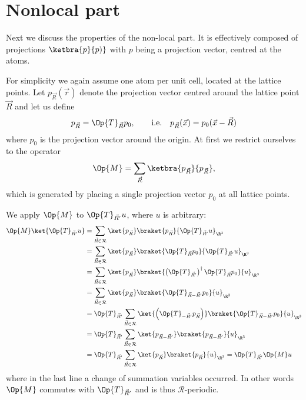 \documentclass{MFHarticle}
\begin{document}
\section{Nonlocal part}
Next we discuss the properties of the non-local part.
It is effectively composed of projections $\ketbra{p}{p)}$
with $p$ being a projection vector, centred at the atoms.

For simplicity we again assume one atom per unit cell,
located at the lattice points.
Let $p_{\vec{R}}(\vec{r})$ denote the projection vector centred
around the lattice point $\vec{R}$ and let us define
\[ p_{\vec{R}} = \Op{T}_{\vec{R}} p_0,
\qquad \text{i.e.} \quad
p_{\vec{R}}(\vec{x}) = p_0(\vec{x} - \vec{R})   \]
where $p_0$ is the projection vector around the origin.
At first we restrict ourselves to the operator
\[ \Op{M} = \sum_{\vec{R}} \ketbra{p_{\vec{R}}}{p_{\vec{R}} }, \]
which is generated by placing a single projection vector $p_0$
at all lattice points.

We apply $\Op{M}$ to $\Op{T}_{\vec{R}'} u$, where $u$ is arbitrary:
\begin{align*}
\Op{M} \ket{\Op{T}_{\vec{R}'} u}
&= \sum_{\vec{R} \in \mathcal{R}}
\ket{p_{\vec{R}}} \braket{p_{\vec{R}}}{\Op{T}_{\vec{R}'} u}_{\R^3} \\
&= \sum_{\vec{R} \in \mathcal{R}} \ket{p_{\vec{R}}}
\braket{\Op{T}_{\vec{R}} p_0}{\Op{T}_{\vec{R}'} u}_{\R^3} \\
&= \sum_{\vec{R} \in \mathcal{R}} \ket{p_{\vec{R}}}
\braket{\left( \Op{T}_{\vec{R}'} \right)^\dagger \Op{T}_{\vec{R}} p_0}{u}_{\R^3} \\
&= \sum_{\vec{R} \in \mathcal{R}} \ket{p_{\vec{R}}}
\braket{\Op{T}_{\vec{R} - \vec{R}'} p_0}{u}_{\R^3} \\
&= \Op{T}_{\vec{R}'} \sum_{\vec{R} \in \mathcal{R}}
\ket{\left(\Op{T}_{-\vec{R}'} p_{\vec{R}}\right)}
\braket{\Op{T}_{\vec{R} - \vec{R}'} p_0}{u}_{\R^3} \\
&= \Op{T}_{\vec{R}'} \sum_{\vec{R} \in \mathcal{R}}
\ket{p_{\vec{R}- \vec{R}'}} \braket{p_{\vec{R}- \vec{R}'}}{u}_{\R^3} \\
&= \Op{T}_{\vec{R}'} \sum_{\vec{R} \in \mathcal{R}}
\ket{p_{\vec{R}}} \braket{p_{\vec{R}}}{u}_{\R^3} = \Op{T}_{\vec{R}'} \Op{M} u
\end{align*}
where in the last line a change of summation variables occurred.
In other words $\Op{M}$ commutes with $\Op{T}_{\vec{R}'}$
and is thus $\mathcal{R}$-periodic.
\end{document}
